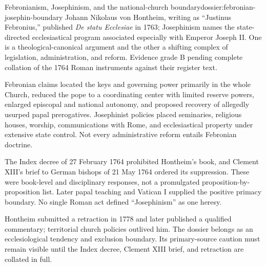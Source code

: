 \begin{heresydossier}{Febronianism, Josephinism, and the national-church boundary}{dossier:febronian-josephin-boundary}
\objectfield Johann Nikolaus von Hontheim, writing as ``Justinus Febronius,'' published \emph{De statu Ecclesiae} in 1763; Josephinism names the state-directed ecclesiastical program associated especially with Emperor Joseph II. One is a theological-canonical argument and the other a shifting complex of legislation, administration, and reform. Evidence grade B pending complete collation of the 1764 Roman instruments against their register text.

\propositionfield Febronian claims located the keys and governing power primarily in the whole Church, reduced the pope to a coordinating center with limited reserve powers, enlarged episcopal and national autonomy, and proposed recovery of allegedly usurped papal prerogatives. Josephinist policies placed seminaries, religious houses, worship, communications with Rome, and ecclesiastical property under extensive state control. Not every administrative reform entails Febronian doctrine.

\responsefield The Index decree of 27 February 1764 prohibited Hontheim's book, and Clement XIII's brief to German bishops of 21 May 1764 ordered its suppression. These were book-level and disciplinary responses, not a promulgated proposition-by-proposition list. Later papal teaching and Vatican I supplied the positive primacy boundary. No single Roman act defined ``Josephinism'' as one heresy.

\aftermathfield Hontheim submitted a retraction in 1778 and later published a qualified commentary; territorial church policies outlived him. The dossier belongs as an ecclesiological tendency and exclusion boundary. Its primary-source caution must remain visible until the Index decree, Clement XIII brief, and retraction are collated in full.
\end{heresydossier}

